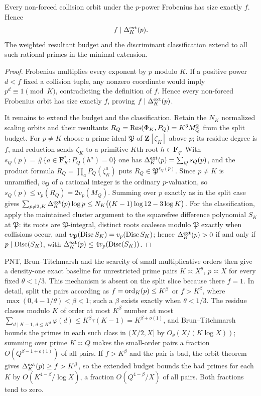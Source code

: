 \begin{theorem}\label{thm:frob}
Every non-forced collision orbit under the $p$-power Frobenius has size exactly
$f$.  Hence
\[
f\mid\Delta_K^{\rm ext}(p).
\]
The weighted resultant budget and the discriminant classification extend to
all such rational primes in the minimal extension.
\end{theorem}

\begin{proof}
Frobenius multiplies every exponent by $p$ modulo $K$.  If a positive power
$d<f$ fixed a collision tuple, any nonzero coordinate would imply
$p^d\equiv1\pmod K$, contradicting the definition of $f$.  Hence every
non-forced Frobenius orbit has size exactly $f$, proving
$f\mid\Delta_K^{\rm ext}(p)$.

It remains to extend the budget and the classification.  Retain the
$N_K$ normalized scaling orbits and their resultants
$R_Q=\operatorname{Res}(\Phi_K,P_Q)=K^3M_Q^2$ from the split budget.  For $p\ne K$
choose a prime ideal $\mathfrak P$ of $\mathbf Z[\zeta_K]$ above
$p$; its residue degree is $f$, and reduction sends $\zeta_K$ to a
primitive $K$th root $h\in\mathbf F_q$.  With
$s_Q(p)=\#\{a\in\mathbf F_K^\ast:P_Q(h^a)=0\}$ one has
$\Delta_K^{\rm ext}(p)=\sum_Qs_Q(p)$, and the product formula
$R_Q=\prod_aP_Q(\zeta_K^a)$ puts $R_Q\in\mathfrak P^{s_Q(p)}$.
Since $p\ne K$ is unramified, $v_{\mathfrak P}$ of a rational
integer is the ordinary $p$-valuation, so
$s_Q(p)\le v_p(R_Q)=2v_p(M_Q)$.  Summing over $p$ exactly as in the
split case gives
$\sum_{p\ne2,K}\Delta_K^{\rm ext}(p)\log p
 \le N_K\bigl((K-1)\log12-3\log K\bigr)$.
For the classification, apply the maintained cluster argument to
the squarefree difference polynomial $S_K$ at $\mathfrak P$: its
roots are $\mathfrak P$-integral, distinct roots coalesce modulo
$\mathfrak P$ exactly when collisions occur, and
$v_{\mathfrak P}(\operatorname{Disc} S_K)=v_p(\operatorname{Disc} S_K)$; hence
$\Delta_K^{\rm ext}(p)>0$ if and only if $p\mid\operatorname{Disc}(S_K)$, with
$\Delta_K^{\rm ext}(p)\le4v_p(\operatorname{Disc}(S_K))$.
\end{proof}

PNT, Brun--Titchmarsh and the scarcity of small multiplicative orders then give
a density-one exact baseline for unrestricted prime pairs
$K\asymp X^\theta$, $p\asymp X$ for every fixed $\theta<1/3$.  This mechanism
is absent on the split slice because there $f=1$.  In detail, split
the pairs according as $f=\operatorname{ord}_K(p)\le K^\beta$ or $f>K^\beta$,
where $\max(0,4-1/\theta)<\beta<1$; such a $\beta$ exists exactly
when $\theta<1/3$.  The residue classes modulo $K$ of order at
most $K^\beta$ number at most
$\sum_{d\mid K-1,\,d\le K^\beta}\varphi(d)\le K^\beta\tau(K-1)
 =K^{\beta+o(1)}$,
and Brun--Titchmarsh bounds the primes in each such class in
$(X/2,X]$ by $O_\theta(X/(K\log X))$; summing over prime
$K\asymp Q$ makes the small-order pairs a fraction
$O(Q^{\beta-1+o(1)})$ of all pairs.  If $f>K^\beta$ and the pair is
bad, the orbit theorem gives
$\Delta_K^{\rm ext}(p)\ge f>K^\beta$, so the extended budget bounds
the bad primes for each $K$ by $O(K^{4-\beta}/\log X)$, a fraction
$O(Q^{4-\beta}/X)$ of all pairs.  Both fractions tend to zero.

